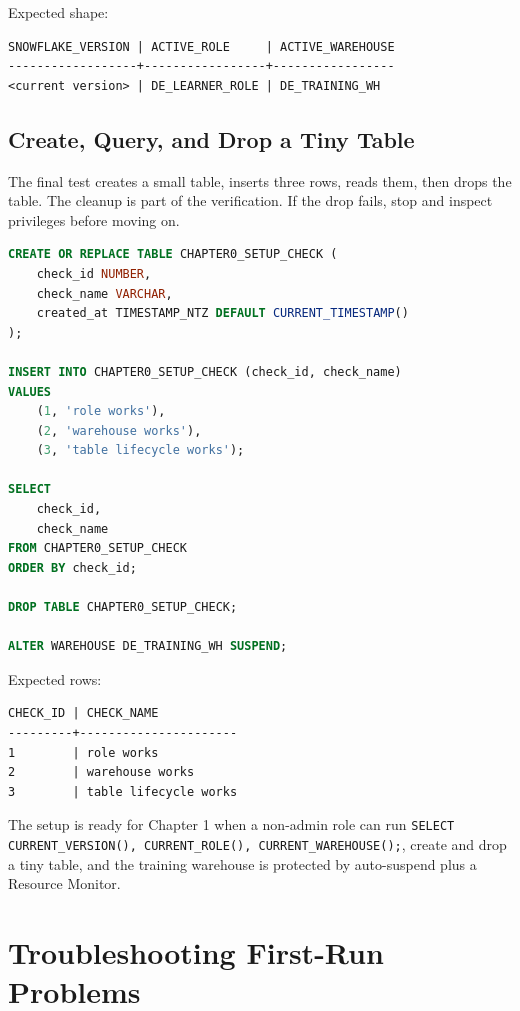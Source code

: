 Expected shape:
\begin{lstlisting}[language={},caption={Expected verification output shape.},label={lst:chapter0-context-output}]
SNOWFLAKE_VERSION | ACTIVE_ROLE     | ACTIVE_WAREHOUSE
------------------+-----------------+-----------------
<current version> | DE_LEARNER_ROLE | DE_TRAINING_WH
\end{lstlisting}

\subsection{Create, Query, and Drop a Tiny Table}
The final test creates a small table, inserts three rows, reads them, then drops the table. The cleanup is part of the verification. If the drop fails, stop and inspect privileges before moving on.

\begin{lstlisting}[language=SQL,caption={End-to-end setup verification with a disposable table.},label={lst:chapter0-table-check}]
CREATE OR REPLACE TABLE CHAPTER0_SETUP_CHECK (
    check_id NUMBER,
    check_name VARCHAR,
    created_at TIMESTAMP_NTZ DEFAULT CURRENT_TIMESTAMP()
);

INSERT INTO CHAPTER0_SETUP_CHECK (check_id, check_name)
VALUES
    (1, 'role works'),
    (2, 'warehouse works'),
    (3, 'table lifecycle works');

SELECT
    check_id,
    check_name
FROM CHAPTER0_SETUP_CHECK
ORDER BY check_id;

DROP TABLE CHAPTER0_SETUP_CHECK;

ALTER WAREHOUSE DE_TRAINING_WH SUSPEND;
\end{lstlisting}

Expected rows:
\begin{lstlisting}[language={},caption={Expected rows from the disposable setup check.},label={lst:chapter0-table-output}]
CHECK_ID | CHECK_NAME
---------+----------------------
1        | role works
2        | warehouse works
3        | table lifecycle works
\end{lstlisting}

\begin{definitionbox}
The setup is ready for Chapter 1 when a non-admin role can run \texttt{SELECT CURRENT\_VERSION(), CURRENT\_ROLE(), CURRENT\_WAREHOUSE();}, create and drop a tiny table, and the training warehouse is protected by auto-suspend plus a Resource Monitor.
\end{definitionbox}

\section{Troubleshooting First-Run Problems}
